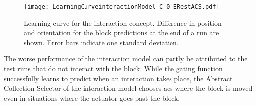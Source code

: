 \begin{figure}[h]
\centering
\texttt{[image: LearningCurveinteractionModel\_C\_0\_ERestACS.pdf]}
\caption{Learning curve for the interaction concept. Difference in position and orientation for the block predictions at the end of a run are shown. Error bars indicate one standard deviation.}
\label{fig:learnCurveInteraction}
\end{figure}
%
%
%
%

The worse performance of the interaction model can partly be attributed to the test runs that do not interact with the block. While the gating function successfully learns to predict when an interaction takes place, the Abstract Collection Selector of the interaction model chooses \glspl{ac} where the block is moved even in situations where the actuator goes past the block.

